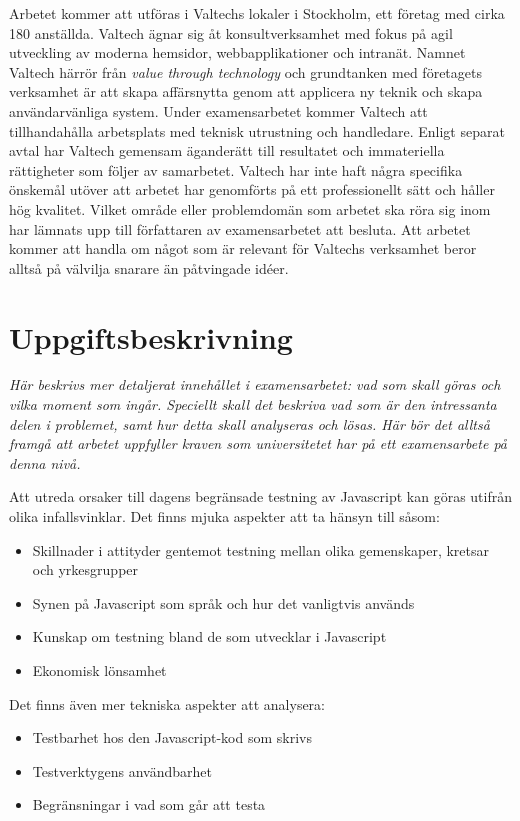 \documentclass[11pt]{article}
\begin{document}
Arbetet kommer att utföras i Valtechs lokaler i Stockholm, ett företag med cirka 180 anställda. Valtech ägnar sig åt konsultverksamhet med fokus på agil utveckling av moderna hemsidor, webbapplikationer och intranät. Namnet Valtech härrör från \textit{\foreignlanguage{english}{value through technology}} och grundtanken med företagets verksamhet är att skapa affärsnytta genom att applicera ny teknik och skapa användarvänliga system. Under examensarbetet kommer Valtech att tillhandahålla arbetsplats med teknisk utrustning och handledare. Enligt separat avtal har Valtech gemensam äganderätt till resultatet och immateriella rättigheter som följer av samarbetet. Valtech har inte haft några specifika önskemål utöver att arbetet har genomförts på ett professionellt sätt och håller hög kvalitet. Vilket område eller problemdomän som arbetet ska röra sig inom har lämnats upp till författaren av examensarbetet att besluta. Att arbetet kommer att handla om något som är relevant för Valtechs verksamhet beror alltså på välvilja snarare än påtvingade idéer.

\section{Uppgiftsbeskrivning}

\textit{Här beskrivs mer detaljerat innehållet i examensarbetet: vad som skall göras och vilka moment som ingår. Speciellt skall det beskriva vad som är den intressanta delen i problemet, samt hur detta skall analyseras och lösas. Här bör det alltså framgå att arbetet uppfyller kraven som universitetet har på ett examensarbete på denna nivå.}

Att utreda orsaker till dagens begränsade testning av Javascript kan göras utifrån olika infallsvinklar. Det finns mjuka aspekter att ta hänsyn till såsom:
\begin{itemize}
\item Skillnader i attityder gentemot testning mellan olika gemenskaper, kretsar och yrkesgrupper
\item Synen på Javascript som språk och hur det vanligtvis används
\item Kunskap om testning bland de som utvecklar i Javascript
\item Ekonomisk lönsamhet
\end{itemize}

Det finns även mer tekniska aspekter att analysera:
\begin{itemize}
\item Testbarhet hos den Javascript-kod som skrivs
\item Testverktygens användbarhet
\item Begränsningar i vad som går att testa
\end{itemize}
\end{document}

